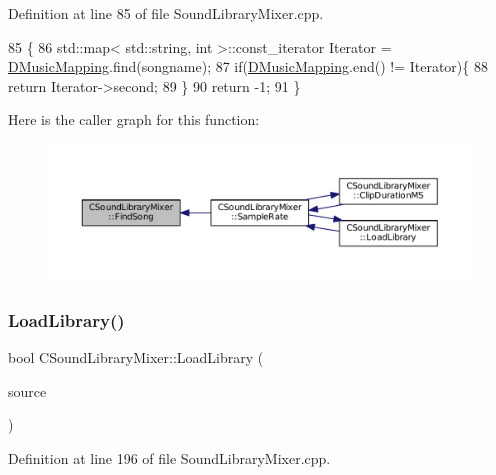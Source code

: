 Definition at line 85 of file Sound\+Library\+Mixer.\+cpp.


\begin{DoxyCode}
85                                                                \{
86     std::map< std::string, int >::const\_iterator Iterator = \hyperlink{classCSoundLibraryMixer_ada2510450315651ebe948ce63960b98a}{DMusicMapping}.find(songname);
87     \textcolor{keywordflow}{if}(\hyperlink{classCSoundLibraryMixer_ada2510450315651ebe948ce63960b98a}{DMusicMapping}.end() != Iterator)\{
88         \textcolor{keywordflow}{return} Iterator->second;
89     \}
90     \textcolor{keywordflow}{return} -1;
91 \}
\end{DoxyCode}
Here is the caller graph for this function\+:
\nopagebreak
\begin{figure}[H]
\begin{center}
\leavevmode
\includegraphics[width=350pt]{classCSoundLibraryMixer_a67d0364979fab26c2b2467357ec03696_icgraph}
\end{center}
\end{figure}
\hypertarget{classCSoundLibraryMixer_a9753684f44863e3c7cc4d319370cda1d}{}\label{classCSoundLibraryMixer_a9753684f44863e3c7cc4d319370cda1d} 
\subsubsection{\texorpdfstring{Load\+Library()}{LoadLibrary()}}
{\footnotesize\ttfamily bool C\+Sound\+Library\+Mixer\+::\+Load\+Library (\begin{DoxyParamCaption}\item[{std\+::shared\+\_\+ptr$<$ \hyperlink{classCDataSource}{C\+Data\+Source} $>$}]{source }\end{DoxyParamCaption})}



Definition at line 196 of file Sound\+Library\+Mixer.\+cpp.


